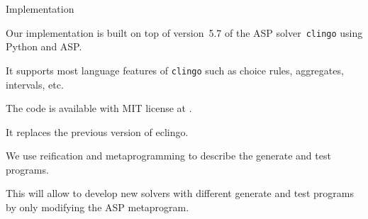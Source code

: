 \documentclass[aspectratio=169,svgnames,xcolor=table,t]{beamer}
\begin{document}
\begin{frame}[c]{Implementation}
    \begin{myitemize}
        \item[] Our implementation is built on top of version~5.7 of the ASP solver~\texttt{clingo} using Python and ASP.%
        \begin{myitemize}
            \item It supports most language features of \texttt{clingo} such as choice rules, aggregates, intervals, etc.
            
            \item The code is available with MIT license at .
            
            \item It replaces the previous version of eclingo.
                        
            \item We use reification and metaprogramming to describe the generate and test programs.
            
            \item This will allow to develop new solvers with different generate and test programs by only modifying the ASP metaprogram.
        \end{myitemize}
    \end{myitemize}
\end{frame}
\end{document}
